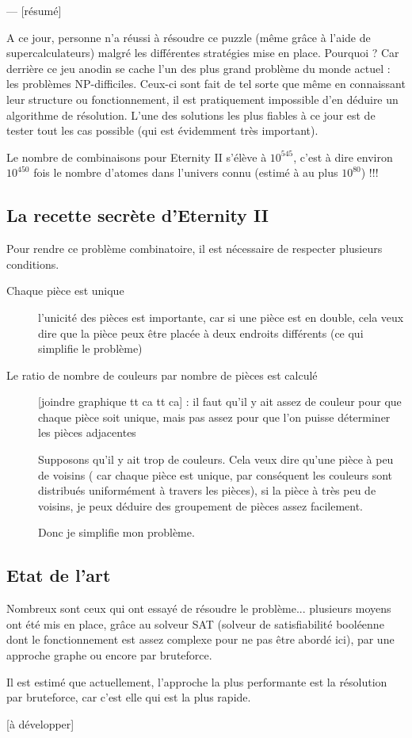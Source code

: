 	--- [résumé]
	
	A ce jour, personne n'a réussi à résoudre ce puzzle (même grâce à l'aide de supercalculateurs) malgré les différentes stratégies mise en place. Pourquoi ? Car derrière ce jeu anodin se cache l'un des plus grand problème du monde actuel : les problèmes NP-difficiles. Ceux-ci sont fait de tel sorte que même en connaissant leur structure ou fonctionnement, il est pratiquement impossible d'en déduire un algorithme de résolution. L'une des solutions les plus fiables à ce jour est de tester tout les cas possible (qui est évidemment très important).
	
	\begin{exmp}
		Le nombre de combinaisons pour Eternity II s'élève à $10^{545}$, c'est à dire environ $10^{450}$ fois le nombre d'atomes dans l'univers connu (estimé à au plus $10^{80}$) !!!
	\end{exmp}
	
	\subsection{La recette secrète d'Eternity II}
	
	Pour rendre ce problème combinatoire, il est nécessaire de respecter plusieurs conditions.
	
	\begin{description}
		\item[Chaque pièce est unique] l'unicité des pièces est importante, car si une pièce est en double, cela veux dire que la pièce peux être placée à deux endroits différents (ce qui simplifie le problème)
		\item[Le ratio de nombre de couleurs par nombre de pièces est calculé] [joindre graphique tt ca tt ca] : il faut qu'il y ait assez de couleur pour que chaque pièce soit unique, mais pas assez pour que l'on puisse déterminer les pièces adjacentes
		
		\begin{exmp}
			Supposons qu'il y ait trop de couleurs. Cela veux dire qu'une pièce à peu de voisins ( car chaque pièce est unique, par conséquent les couleurs sont distribués uniformément à travers les pièces), si la pièce à très peu de voisins, je peux déduire des groupement de pièces assez facilement.
			
			Donc je simplifie mon problème.
		\end{exmp}		
	\end{description}
	
	\subsection{Etat de l'art}
	
	Nombreux sont ceux qui ont essayé de résoudre le problème... plusieurs moyens ont été mis en place, grâce au solveur SAT (solveur de satisfiabilité booléenne dont le fonctionnement est assez complexe pour ne pas être abordé ici), par une approche graphe ou encore par bruteforce.
	
	Il est estimé que actuellement, l'approche la plus performante est la résolution par bruteforce, car c'est elle qui est la plus rapide.
	
	[à développer]
